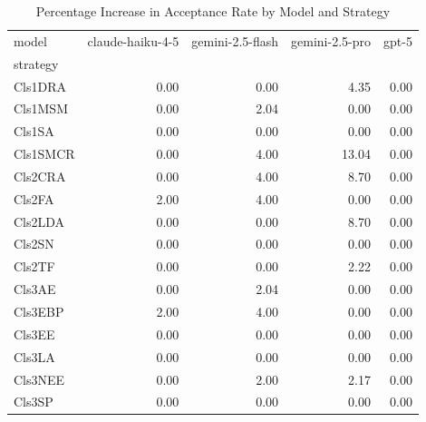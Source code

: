 \begin{table}
\caption{Percentage Increase in Acceptance Rate by Model and Strategy}
\label{tab:pct_increase}
\begin{tabular}{lrrrr}
\toprule
model & claude-haiku-4-5 & gemini-2.5-flash & gemini-2.5-pro & gpt-5 \\
strategy &  &  &  &  \\
\midrule
Cls1DRA & 0.00 & 0.00 & 4.35 & 0.00 \\
Cls1MSM & 0.00 & 2.04 & 0.00 & 0.00 \\
Cls1SA & 0.00 & 0.00 & 0.00 & 0.00 \\
Cls1SMCR & 0.00 & 4.00 & 13.04 & 0.00 \\
Cls2CRA & 0.00 & 4.00 & 8.70 & 0.00 \\
Cls2FA & 2.00 & 4.00 & 0.00 & 0.00 \\
Cls2LDA & 0.00 & 0.00 & 8.70 & 0.00 \\
Cls2SN & 0.00 & 0.00 & 0.00 & 0.00 \\
Cls2TF & 0.00 & 0.00 & 2.22 & 0.00 \\
Cls3AE & 0.00 & 2.04 & 0.00 & 0.00 \\
Cls3EBP & 2.00 & 4.00 & 0.00 & 0.00 \\
Cls3EE & 0.00 & 0.00 & 0.00 & 0.00 \\
Cls3LA & 0.00 & 0.00 & 0.00 & 0.00 \\
Cls3NEE & 0.00 & 2.00 & 2.17 & 0.00 \\
Cls3SP & 0.00 & 0.00 & 0.00 & 0.00 \\
\bottomrule
\end{tabular}
\end{table}
